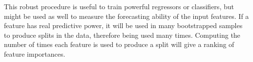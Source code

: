This robust procedure is useful to train powerful regressors or classifiers, but might be used as well to measure the forecasting ability of the input features. If a feature has real predictive power, it will be used in many bootstrapped samples to produce splits in the data, therefore being used many times. Computing the number of times each feature is used to produce a split will give a ranking of feature importances.\\